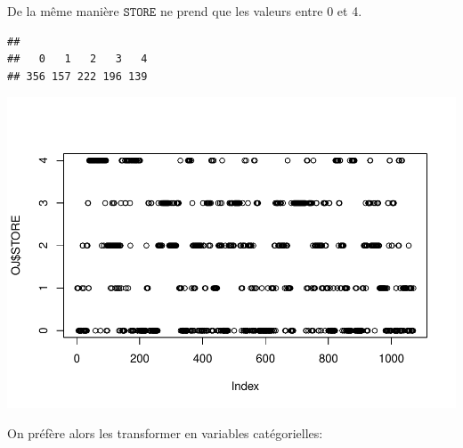 \documentclass[]{article}
\newenvironment{Shaded}{\begin{snugshade}}{\end{snugshade}}
\newcommand{\CommentTok}[1]{\textcolor[rgb]{0.56,0.35,0.01}{\textit{#1}}}
\newcommand{\DecValTok}[1]{\textcolor[rgb]{0.00,0.00,0.81}{#1}}
\newcommand{\KeywordTok}[1]{\textcolor[rgb]{0.13,0.29,0.53}{\textbf{#1}}}
\newcommand{\NormalTok}[1]{#1}
\newcommand{\OperatorTok}[1]{\textcolor[rgb]{0.81,0.36,0.00}{\textbf{#1}}}
\newcommand{\StringTok}[1]{\textcolor[rgb]{0.31,0.60,0.02}{#1}}
\begin{document}
De la même manière \(\texttt{STORE}\) ne prend que les valeurs entre 0
et 4.

\begin{Shaded}
\end{Shaded}

\begin{verbatim}
## 
##   0   1   2   3   4 
## 356 157 222 196 139
\end{verbatim}

\begin{Shaded}
\end{Shaded}

\includegraphics{durand_eltarr_files/figure-latex/unnamed-chunk-5-1.pdf}

On préfère alors les transformer en variables catégorielles:

\begin{Shaded}
\end{Shaded}
\end{document}
